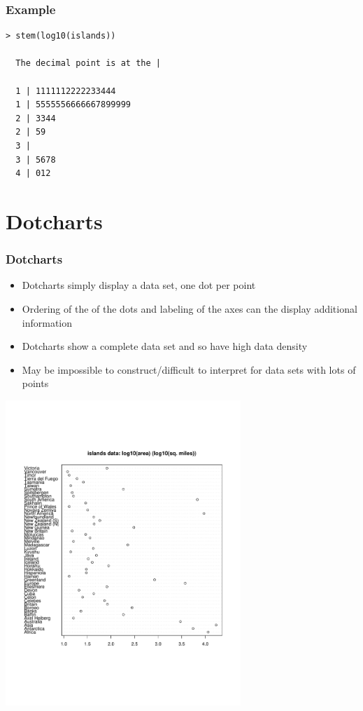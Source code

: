 \documentclass[aspectratio=169]{beamer}
\begin{document}
\begin{frame}[fragile]\frametitle{Example}
\begin{verbatim}
> stem(log10(islands))

  The decimal point is at the |

  1 | 1111112222233444
  1 | 5555556666667899999
  2 | 3344
  2 | 59
  3 | 
  3 | 5678
  4 | 012
\end{verbatim}
\end{frame}

\section{Dotcharts}
\begin{frame}\frametitle{Dotcharts}
\begin{itemize}
\item Dotcharts simply display a data set, one dot per point
\item Ordering of the of the dots and labeling of the axes
  can the display additional information
\item Dotcharts show a complete data set and so have high
  data density
\item May be impossible to construct/difficult to interpret
  for data sets with lots of points
\end{itemize}
\end{frame}

\begin{frame}
\includegraphics[width=3.5in]{dotChart.pdf}
\end{frame}
\end{document}

